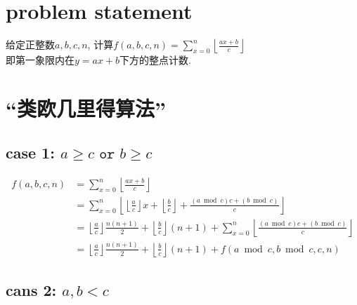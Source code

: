 \documentclass{article}
\begin{document}
\section{problem statement}

\noindent 给定正整数$a,b,c,n$,
计算$\displaystyle f(a,b,c,n)=\sum_{x=0}^n \left\lfloor\frac{ax+b}{c}\right\rfloor$\\
即第一象限内在$y=ax+b$下方的整点计数.

\section{``类欧几里得算法''}

\subsection*{case 1: $a\geq c \texttt{ or } b\geq c$}

\[
	\begin{aligned}
		f(a,b,c,n)
			&=\sum_{x=0}^n \left\lfloor\frac{ax+b}{c}\right\rfloor\\
			&=\sum_{x=0}^n
				\left\lfloor
					\left\lfloor\frac{a}{c}\right\rfloor x + \left\lfloor\frac{b}{c}\right\rfloor +
					\frac{(a\bmod c)c+(b\bmod c)}{c}
				\right\rfloor\\
			&=\left\lfloor\frac{a}{c}\right\rfloor\frac{n(n+1)}{2} + \left\lfloor\frac{b}{c}\right\rfloor(n+1) +
				\sum_{x=0}^n
					\left\lfloor
						\frac{(a\bmod c)c+(b\bmod c)}{c}
					\right\rfloor\\
			&=\left\lfloor\frac{a}{c}\right\rfloor\frac{n(n+1)}{2} + \left\lfloor\frac{b}{c}\right\rfloor(n+1)
				+ f(a\bmod c,b\bmod c,c,n)
	\end{aligned}
\]


\subsection*{cans 2: $a,b < c$}
\end{document}
